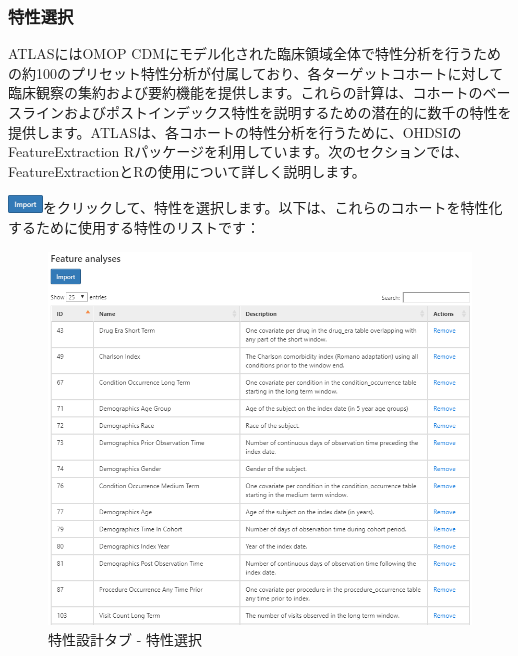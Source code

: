 \documentclass[
  11pt]{book}
\theoremstyle{definition}
\theoremstyle{definition}
\theoremstyle{definition}
\theoremstyle{definition}
\theoremstyle{remark}
\begin{document}
\subsubsection*{特性選択}\label{ux7279ux6027ux9078ux629e}

ATLASにはOMOP CDMにモデル化された臨床領域全体で特性分析を行うための約100のプリセット特性分析が付属しており、各ターゲットコホートに対して臨床観察の集約および要約機能を提供します。これらの計算は、コホートのベースラインおよびポストインデックス特性を説明するための潜在的に数千の特性を提供します。ATLASは、各コホートの特性分析を行うために、OHDSIのFeatureExtraction Rパッケージを利用しています。次のセクションでは、FeatureExtractionとRの使用について詳しく説明します。

\includegraphics{images/Characterization/atlasImportButton.png}をクリックして、特性を選択します。以下は、これらのコホートを特性化するために使用する特性のリストです：

\begin{figure}

{\centering \includegraphics[width=1\linewidth]{images/Characterization/atlasCharacterizationFeatureSelection} 

}

\caption{特性設計タブ - 特性選択}\label{fig:atlasCharacterizationFeatureSelection}
\end{figure}
\end{document}
